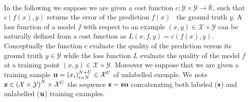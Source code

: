 \paragraph{}
In the following we suppose we are given a cost function $c:\mathcal{Y}\times\mathcal{Y}\to\overline{\mathbb{R}}$, such that $c(f(x),y)$ returns the error of the prediction $f(x)$ \wrt~the ground truth $y$. A loss function of a model $f$ with respect to an example $(x,y)\in\mathcal{X}\times\mathcal{Y}$ can be naturally defined from a cost function as $L(x,f,y)=c(f(x),y)$. Conceptually the function $c$ evaluate the quality of the prediction versus its ground truth $y\in\mathcal{Y}$ while the loss function $L$ evaluate the quality of the model $f$ at a training point $(x,y)\in\mathcal{X}\times\mathcal{Y}$. Moreover we suppose that we are given a training sample $\boldsymbol{\mathbf{u}}=(x_i)_{i=N}^{N+U}\in\mathcal{X}^U$ of unlabelled exemple. We note $\boldsymbol{\mathbf{z}}\in\left(\mathcal{X}\times\mathcal{Y}\right)^N\times\mathcal{X}^U$ the sequence $\boldsymbol{\mathbf{z}}=\boldsymbol{\mathbf{s}}\boldsymbol{\mathbf{u}}$ concatenating both labeled ($\boldsymbol{\mathbf{s}}$) and unlabelled ($\boldsymbol{\mathbf{u}}$) training examples.

